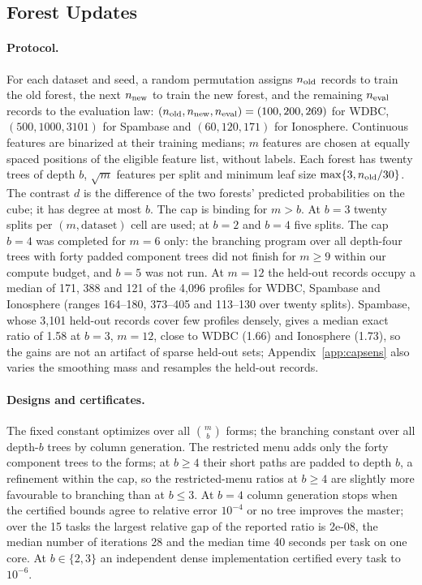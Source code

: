 \subsection{Forest Updates}\label{app:forestexact}
\paragraph{Protocol.}
For each dataset and seed, a random permutation assigns $n_{\rm old}$ records to train the old forest, the next $n_{\rm new}$ to train the new forest, and the remaining $n_{\rm eval}$ records to the evaluation law: $(n_{\rm old},n_{\rm new},n_{\rm eval})=(100,200,269)$ for WDBC, $(500,1000,3101)$ for Spambase and $(60,120,171)$ for Ionosphere. Continuous features are binarized at their training medians; $m$ features are chosen at equally spaced positions of the eligible feature list, without labels. Each forest has twenty trees of depth $b$, $\sqrt m$ features per split and minimum leaf size $\max\{3,n_{\rm old}/30\}$. The contrast $d$ is the difference of the two forests' predicted probabilities on the cube; it has degree at most $b$. The cap is binding for $m>b$. At $b=3$ twenty splits per $(m,\text{dataset})$ cell are used; at $b=2$ and $b=4$ five splits. The cap $b=4$ was completed for $m=6$ only: the branching program over all depth-four trees with forty padded component trees did not finish for $m\ge9$ within our compute budget, and $b=5$ was not run. At $m=12$ the held-out records occupy a median of 171, 388 and 121 of the 4,096 profiles for WDBC, Spambase and Ionosphere (ranges 164--180, 373--405 and 113--130 over twenty splits). Spambase, whose 3,101 held-out records cover few profiles densely, gives a median exact ratio of 1.58 at $b=3$, $m=12$, close to WDBC (1.66) and Ionosphere (1.73), so the gains are not an artifact of sparse held-out sets; Appendix~\ref{app:capsens} also varies the smoothing mass and resamples the held-out records.

\paragraph{Designs and certificates.}
The fixed constant optimizes over all $\binom mb$ forms; the branching constant over all depth-$b$ trees by column generation. The restricted menu adds only the forty component trees to the forms; at $b\ge4$ their short paths are padded to depth $b$, a refinement within the cap, so the restricted-menu ratios at $b\ge4$ are slightly more favourable to branching than at $b\le3$. At $b=4$ column generation stops when the certified bounds agree to relative error $10^{-4}$ or no tree improves the master; over the 15 tasks the largest relative gap of the reported ratio is 2e-08, the median number of iterations 28 and the median time 40 seconds per task on one core. At $b\in\{2,3\}$ an independent dense implementation certified every task to $10^{-6}$.

